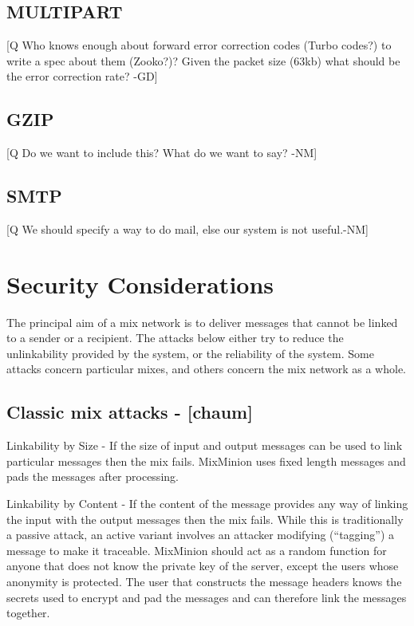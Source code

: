 \documentclass{article}
\begin{document}
\subsection{MULTIPART}

[Q Who knows enough about forward error correction codes (Turbo codes?)
to write a spec about them (Zooko?)? Given the packet size (63kb)
what should be the error correction rate? -GD]

\subsection{GZIP}

[Q Do we want to include this?  What do we want to say? -NM]

\subsection{SMTP}

[Q We should specify a way to do mail, else our system is not useful.-NM]

\section{Security Considerations}

The principal aim of a mix network is
to deliver messages that cannot be linked to a sender or a
recipient. The attacks below either try to reduce the unlinkability
provided by the system, or the reliability of the system. Some
attacks concern particular mixes, and others concern the mix network as a
whole.

\subsection{Classic mix attacks - [chaum]}

Linkability by Size - If the size of input and output messages can be
used to link particular messages then the mix fails. MixMinion uses
fixed length messages and pads the messages after processing.

Linkability by Content - If the content of the message provides any way
of linking the input with the output messages then the mix fails. While
this is traditionally a passive attack, an active variant involves an
attacker modifying (``tagging'') a message to make it traceable.
MixMinion should act as a random function for anyone that
does not know the private key of the server, except the users whose
anonymity is protected. The user that constructs the message headers
knows the secrets used to encrypt and pad the messages and can
therefore link the messages together.
\end{document}
